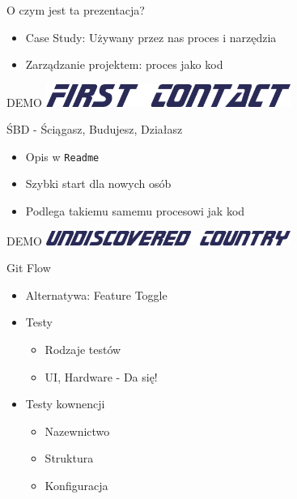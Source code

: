 \documentclass[ignorenonframetext]{beamer}
\begin{document}
\begin{frame}{O czym jest ta prezentacja?}
\begin{itemize}
	\item Case Study: Używany przez nas proces i narzędzia
	\item Zarządzanie projektem: proces jako kod
\end{itemize}
\end{frame}

\begin{frame}{DEMO}
\centering
\includegraphics[width=8cm]{images/first-contact.png}
\end{frame}

\begin{frame}{ŚBD - Ściągasz, Budujesz, Działasz}
\begin{itemize}
	\item Opis w \texttt{Readme}
	\item Szybki start dla nowych osób
	\item Podlega takiemu samemu procesowi jak kod
\end{itemize}
\end{frame}

\begin{frame}{DEMO}
	\centering
	\includegraphics[width=8cm]{images/undiscovered-country.png}
\end{frame}

\begin{frame}{Git Flow}
\begin{itemize}
	\item Alternatywa: Feature Toggle
	\item Testy
	\begin{itemize}
		\item Rodzaje testów
		\item UI, Hardware - Da się! 
	\end{itemize}
	\item Testy kownencji
	\begin{itemize}
		\item Nazewnictwo
		\item Struktura
		\item Konfiguracja
	\end{itemize}
\end{itemize}
\end{frame}
\end{document}
